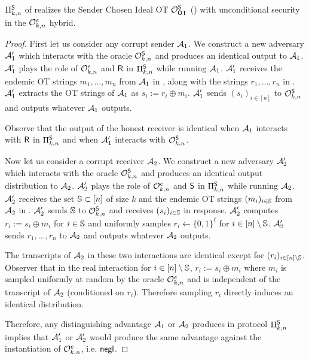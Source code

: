 \begin{lemma}
	$\Pi^{\mathsf{S}}_{k,n}$ of  realizes the Sender Chosen Ideal OT $\mathcal{O}_{\mathsf{OT}}^{\mathsf{S}}$ () with unconditional security in the $\mathcal{O}^{e}_{k,n}$ hybrid.
\end{lemma}

\begin{proof}
	First let us consider any corrupt sender $\mathcal{A}_1$. We construct a new adversary $\mathcal{A}_1'$ which interacts with the oracle $\mathcal{O}^{\mathsf{S}}_{k,n}$ and produces an identical output  to $\mathcal{A}_1$.  $\mathcal{A}_1'$ plays the role of $\mathcal{O}^{e}_{k,n}$ and $\mathsf{R}$ in $\Pi^{\mathsf{S}}_{k,n}$ while running $\mathcal{A}_1$. $\mathcal{A}_1'$ receives the endemic OT strings $m_1,...,m_n$ from $\mathcal{A}_1$ in , along with the strings $r_1,...,r_n$ in .  $\mathcal{A}_1'$ extracts the OT strings of $\mathcal{A}_1$ as $s_i:=r_i\oplus m_i$. $\mathcal{A}_1'$ sends $(s_i)_{i\in [n]}$ to $\mathcal{O}^{\mathsf{S}}_{k,n}$ and outputs whatever $\mathcal{A}_1$ outputs.
	
	Observe that the output of the honest receiver is identical when $\mathcal{A}_1$ interacts with $\mathsf{R}$ in $\Pi^{\mathsf{S}}_{k,n}$ and when $\mathcal{A}_1'$ interacts with $\mathcal{O}^{\mathsf{S}}_{k,n}$.
	
	
	Now let us consider a corrupt receiver $\mathcal{A}_2$. We construct a new adversary $\mathcal{A}_2'$ which interacts with the oracle $\mathcal{O}^{\mathsf{S}}_{k,n}$ and produces an identical output distribution to $\mathcal{A}_2$. $\mathcal{A}_2'$ plays the role of $\mathcal{O}^{e}_{k,n}$ and $\mathsf{S}$ in $\Pi^{\mathsf{S}}_{k,n}$ while running $\mathcal{A}_2$. $\mathcal{A}_2'$ receives the set $\mathsf{\mathbb S}\subset[n]$ of size $k$ and the endemic OT strings $(m_i)_{i\in \mathsf{\mathbb S}}$ from $\mathcal{A}_2$ in . $\mathcal{A}_2'$ sends $\mathsf{\mathbb S}$ to  $\mathcal{O}^{\mathsf{S}}_{k,n}$ and receives $(s_i)_{i\in \mathsf{\mathbb S}}$ in response. $\mathcal{A}_2'$ computes $r_i:=s_i\oplus m_i$ for $i\in \mathsf{\mathbb S}$ and uniformly samples $r_i\gets \{0,1\}^\ell$ for $i\in [n]\setminus \mathsf{\mathbb S}$. $\mathcal{A}_2'$ sends $r_1,...,r_n$ to $\mathcal{A}_2$ and outputs whatever $\mathcal{A}_2$ outputs.

	The transcripts of $\mathcal{A}_2$ in these two interactions are identical except for $(r_i)_{i\in [n]\setminus \mathsf{\mathbb S}}$. Observer that in the real interaction for $i\in [n]\setminus\mathsf{\mathbb S}$, $r_i:=s_i\oplus m_i$ where $m_i$ is sampled uniformly at random  by the oracle $\mathcal{O}^{e}_{k,n}$ and is independent of the transcript of $\mathcal{A}_2$ (conditioned on $r_i$). Therefore sampling $r_i$ directly induces an identical distribution. 
	
	Therefore, any distinguishing advantage $\mathcal{A}_1$ or $\mathcal{A}_2$ produces in protocol $\Pi^{\mathsf{S}}_{k,n}$ implies that $\mathcal{A}_1'$ or $\mathcal{A}_2'$ would produce the same advantage against the instantiation of $\mathcal{O}^{e}_{k,n}$, i.e. $\mathsf{negl}$.
\end{proof}



